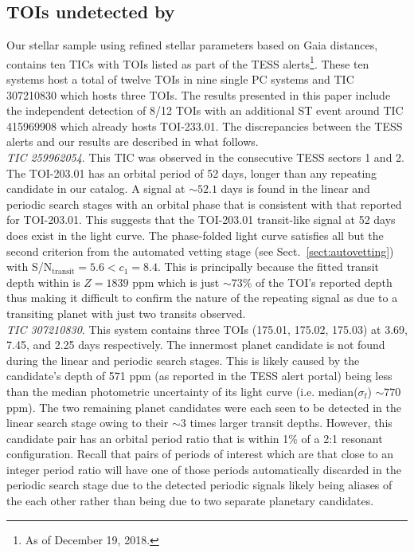 \subsection{TOIs undetected by \pipeline{}} \label{sect:undet}
Our stellar sample using refined stellar parameters based on Gaia distances,
contains ten TICs with TOIs listed as part of the TESS alerts\footnote{As of December 19, 2018.}.
These ten systems host a total of twelve TOIs in nine single PC systems
and TIC 307210830 which hosts three TOIs. The \pipeline{} results presented in this paper
include the independent detection of 8/12 TOIs with an additional ST event around TIC 415969908 which
already hosts TOI-233.01. The discrepancies between the TESS alerts and our \pipeline{} results
are described in what follows. \\

\emph{TIC 259962054}. This TIC was observed in the consecutive TESS sectors 1 and 2.
The TOI-203.01 has an orbital period of 52 days, longer than any repeating
candidate in our catalog. A signal at $\sim 52.1$ days is found in the \pipeline{} linear and
periodic search stages with an orbital phase that is consistent with that reported for TOI-203.01.
This suggests that the TOI-203.01 transit-like signal at 52 days does exist in the light curve.
The phase-folded light curve satisfies all but the second criterion from the automated vetting
stage (see Sect.~\ref{sect:autovetting}) with S/N$_{\text{transit}}=5.6<c_1=8.4$. This is principally
because the fitted transit depth within \pipeline{} is $Z=1839$ ppm  which is just
$\sim 73$\% of the TOI's reported depth thus making it difficult to confirm the nature of the
repeating signal as due to a transiting planet with just two transits observed. \\


\emph{TIC 307210830}. This system contains three TOIs (175.01, 175.02, 175.03) at 3.69, 7.45,
and 2.25 days respectively. The innermost planet candidate is not found during the linear and
periodic search stages. This is likely caused by the candidate's depth of 571 ppm
(as reported in the TESS alert portal) being less than the median photometric uncertainty of
its light curve (i.e. median($\sigma_{\text{f}}$) $\sim 770$ ppm). The two remaining planet candidates were each seen
to be detected in the \pipeline{} linear search stage owing to their $\sim 3$ times larger
transit depths. However, this candidate pair has an orbital period ratio that is within 1\%
of a 2:1 resonant configuration. Recall that pairs of periods of interest which are that close to
an integer period ratio will have one of those periods automatically discarded in the periodic search
stage due to the detected periodic signals likely being aliases of the each other rather than being
due to two separate planetary candidates. \\


